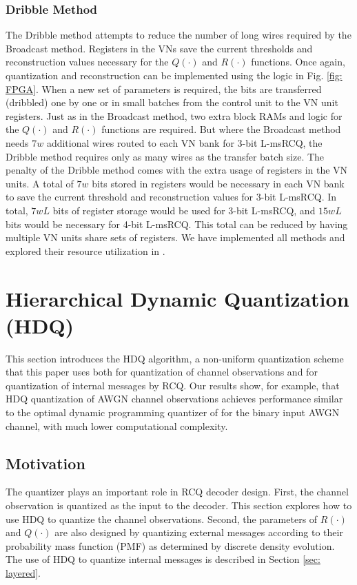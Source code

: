\documentclass [PhD] {uclathes}
\begin{document}
\subsubsection{Dribble Method}
The Dribble method attempts to reduce the number of long wires required by the Broadcast method. Registers in the VNs save the current thresholds and reconstruction values necessary for the $Q(\cdot)$ and $R(\cdot)$ functions. Once again, quantization and reconstruction can be implemented using the logic in Fig. \ref{fig: FPGA}. When a new set of parameters is required, the bits are transferred (dribbled) one by one or in small batches from the control unit to the VN unit registers. Just as in the Broadcast method, two extra block RAMs and logic for the $Q(\cdot)$ and $R(\cdot)$ functions are required. 
But where the Broadcast method needs $7w$ additional wires routed to each VN bank for 3-bit L-msRCQ, the Dribble method requires only as many wires as the transfer batch size. 
The penalty of the Dribble method comes with the extra usage of registers in the VN units.
A total of $7w$ bits stored in registers would be necessary in each VN bank to save the current threshold and reconstruction values for 3-bit L-msRCQ. In total, $7wL$ bits of register storage would be used for 3-bit L-msRCQ, and $15wL$ bits would be necessary for 4-bit L-msRCQ. This total can be reduced by having multiple VN units share sets of registers.
We have implemented all methods and explored their  resource utilization in \cite{Terrill2021-ec}.


\section{Hierarchical Dynamic Quantization (HDQ) }\label{Sec: HDQ}
This section introduces the HDQ algorithm, a non-uniform quantization scheme that this paper uses both for quantization of channel observations and for quantization of internal messages by RCQ. Our results show, for example, that HDQ quantization of AWGN channel observations achieves performance similar to the optimal dynamic programming quantizer of \cite{Kurkoski2014-QuanDMC} for the binary input AWGN channel, with much lower computational complexity. 

\subsection{Motivation}
The quantizer plays an important role in RCQ decoder design. First, the channel observation is quantized as the input to the decoder. This section explores how to use HDQ to quantize the channel observations.  Second, the parameters of $R(\cdot)$ and $Q(\cdot)$ are also designed by quantizing external messages according to their probability mass function (PMF) as determined by discrete density evolution.  The use of HDQ to quantize internal messages is described in Section \ref{sec: layered}. 
\end{document}
